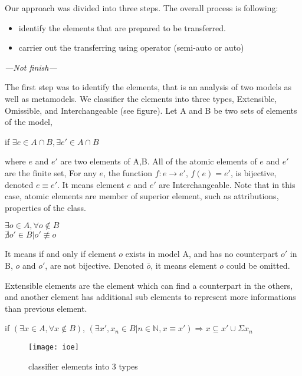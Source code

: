Our approach was divided into three steps. The overall process is following:
\begin{itemize}
	\item identify the elements that are prepared to be transferred. 
	\item carrier out the transferring using operator (semi-auto or auto)
\end{itemize}
{\color{red}\textit{ ---Not finish---}}
\newpage


The first step was to identify the elements, that is an analysis of two models as well as metamodels. We classifier the elements into three types, Extensible, Omissible, and Interchangeable (see figure). 
Let A and B be two sets of elements of the model, 
\begin{center}
    if $\exists e \in A \cap B, \exists e' \in A \cap B$ 
\end{center}
where $e$ and $e'$ are two elements of A,B. All of the atomic elements  of $e$ and $e'$ are the finite set, For any $e$, the function $f:e \longrightarrow  e'$, $f(e) =  e'$, is bijective, denoted $e \equiv e'$. It means element $e$ and $e'$ are Interchangeable.
Note that in this case, atomic elements are member of superior element, such as attributions, properties of the class.

\begin{center}
    $\exists o \in A, \forall o \notin B $ \\ $\nexists o' \in B|o' \not\equiv o$ 
\end{center}
It means if and only if element $o$ exists in model A, and has no counterpart $o'$ in B, $o$ and $o'$, are not bijective. Denoted $\overline{o}$, it means element $o$ could be omitted.

Extensible elements are the element which can find a counterpart in the others, and another element has additional sub elements to represent more informations than previous element.
\begin{center}
	if  $(\exists x \in A, \forall x \notin B )$, $(\exists x',x_{n} \in B |n \in \mathbb{N}, x \equiv x') \Longrightarrow x \subseteq x' \cup \Sigma x_{n}$
\end{center}



\begin{figure}[hbt]
\centering
\texttt{[image: ioe]}
\caption{classifier elements into 3 types}
\label{fig:ioe}
\end{figure}

